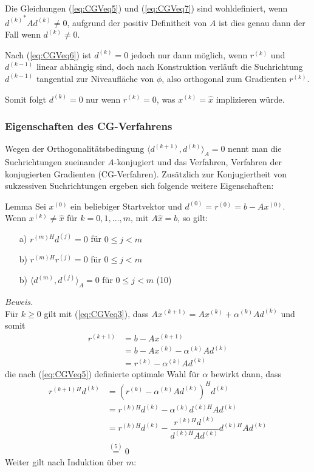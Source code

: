 Die Gleichungen (\ref{eq:CGVeq5}) und (\ref{eq:CGVeq7}) sind wohldefiniert, wenn ${d^{(k)}}^*Ad^{(k)}\neq 0$, 
aufgrund der positiv Definitheit von $A$ ist dies genau dann der Fall wenn $d^{(k)}\neq 0$. 

Nach (\ref{eq:CGVeq6}) ist $d^{(k)} = 0$ jedoch nur dann möglich, wenn $r^{(k)}$ und $d^{(k-1)}$ linear abhängig sind, 
doch nach Konstruktion verläuft die Suchrichtung $d^{(k-1)}$ tangential zur Niveaufläche von $\phi$, 
also orthogonal zum Gradienten $r^{(k)}$.

Somit folgt $d^{(k)} = 0$ nur wenn $r^{(k)}=0$, was $x^{(k)}=\hat{x}$ implizieren würde. 

\subsubsection{Eigenschaften des CG-Verfahrens}
Wegen der Orthogonalitätsbedingung $\langle d^{(k+1)},d^{(k)}\rangle_A=0$ nennt man die 
Suchrichtungen zueinander $A$-konjugiert und das Verfahren, Verfahren der konjugierten Gradienten (CG-Verfahren). 
Zusätzlich zur Konjugiertheit von sukzessiven Suchrichtungen ergeben sich folgende weitere Eigenschaften:

\begin{colbox}{Lemma}\label{lem:CGVprop}
  Sei $x^{(0)}$ ein beliebiger Startvektor und $d^{(0)}=r^{(0)}=b-Ax^{(0)}$. \\
  Wenn $x^{(k)}\neq \hat{x}$ für $k=0,1,\dots, m$, mit $A\hat{x}=b$, so gilt:
  \begin{enumerate}
    \item[a)] ${r^{(m)H}}d^{(j)}=0$ für $0\leq j < m$
    \item[b)] ${r^{(m)H}}r^{(j)}=0$ für $0\leq j < m$ 
    \item[b)] $\langle d^{(m)}, d^{(j)}\rangle_A=0$ für $0\leq j < m$ \qquad (10)\label{eq:CGVeq10}
  \end{enumerate}
\end{colbox}

\textit{Beweis.} \\
Für $k\geq 0$ gilt mit (\ref{eq:CGVeq3}), dass $Ax^{(k+1)} = Ax^{(k)} + \alpha^{(k)} Ad^{(k)}$ und somit 
%
\begin{align*}
  r^{(k+1)} 
  &= b - Ax^{(k+1)} \\
  &= b - Ax^{(k)} - \alpha^{(k)} Ad^{(k)}\\
  &= r^{(k)}-\alpha^{(k)}Ad^{(k)}
  \tag{8}\label{eq:CGVeq8}
\end{align*}
%
die nach (\ref{eq:CGVeq5}) definierte optimale Wahl für $\alpha$ bewirkt dann, dass
%
\begin{align*}
  {r^{(k+1)H}}d^{(k)} &= (r^{(k)}-\alpha^{(k)}Ad^{(k)})^H d^{(k)} \\
  &= {r^{(k)H}} d^{(k)} - \alpha^{(k)}{d^{(k)H}}Ad^{(k)} \\
  &= {r^{(k)H}} d^{(k)} - \dfrac{{r^{(k)H}} d^{(k)}}{d^{(k)H}Ad^{(k)}} d^{(k)H}Ad^{(k)} \\
  &\stackrel{(5)}{=} 0 
  \tag{9}\label{eq:CGVeq9}
\end{align*}
%
Weiter gilt nach Induktion über $m$: 


